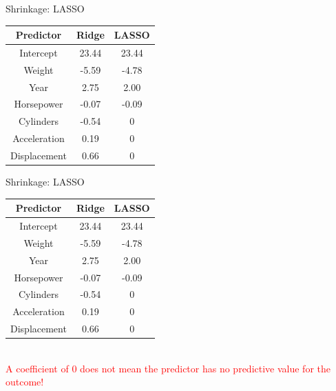 \documentclass[8pt]{beamer}
\begin{document}
    \begin{frame}[t]{Shrinkage: LASSO} %
        \centering
        \vspace{2cm}
        \begin{tabular}{|c|c|c|}
            \hline
            \textbf{Predictor}&\textbf{Ridge}&\textbf{LASSO}\\
            \hline
            Intercept&23.44&23.44\\
            \hline
            Weight&-5.59&-4.78\\
            \hline
            Year&2.75&2.00\\
            \hline
            Horsepower&-0.07&-0.09\\
            \hline
            Cylinders&-0.54&0\\
            \hline
            Acceleration&0.19&0\\
            \hline
            Displacement&0.66&0\\
            \hline
        \end{tabular}
    \end{frame}


    \begin{frame}[t]{Shrinkage: LASSO} %
        \centering
        \vspace{2cm}
        \begin{tabular}{|c|c|c|}
            \hline
            \textbf{Predictor}&\textbf{Ridge}&\textbf{LASSO}\\
            \hline
            Intercept&23.44&23.44\\
            \hline
            Weight&-5.59&-4.78\\
            \hline
            Year&2.75&2.00\\
            \hline
            Horsepower&-0.07&-0.09\\
            \hline
            Cylinders&-0.54&0\\
            \hline
            Acceleration&0.19&0\\
            \hline
            Displacement&0.66&0\\
            \hline
        \end{tabular}\\
        \vspace{1cm}
        \textcolor{red}{A coefficient of 0 does not mean the predictor has no predictive value for the outcome!}
    \end{frame}
\end{document}
